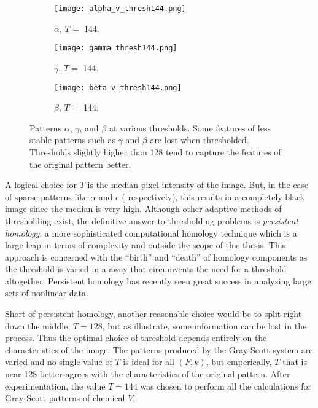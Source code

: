 \begin{figure}[p]
        \begin{subfigure}[b]{0.25\textwidth}
                \texttt{[image: alpha\_v\_thresh144.png]}
                \caption{$\alpha$, $T =$ 144.}
                \label{fig:alpha_144}
        \end{subfigure} \quad
         \begin{subfigure}[b]{0.25\textwidth}
                \texttt{[image: gamma\_thresh144.png]}
                \caption{$\gamma$, $T =$ 144.}
                \label{fig:gamma_144}
        \end{subfigure} \quad
         \begin{subfigure}[b]{0.25\textwidth}
                \texttt{[image: beta\_v\_thresh144.png]}
                \caption{$\beta$, $T =$ 144.}
                \label{fig:beta_144}
        \end{subfigure} \hfill
        \caption{Patterns $\alpha$, $\gamma$, and $\beta$ at various thresholds. Some features of less stable patterns such as $\gamma$ and $\beta$ are lost when thresholded. Thresholds slightly higher than 128 tend to capture the features of the original pattern better.} \label{fig:thresholds}
\end{figure}

A logical choice for $T$ is the median pixel intensity of the image. But, in the case of sparse patterns like $\alpha$ and $\epsilon$ ( respectively), this results in a completely black image since the median is very high. Although other adaptive methods of thresholding exist, the definitive answer to thresholding problems is \emph{persistent homology}, a more sophisticated computational homology technique which is a large leap in terms of complexity and outside the scope of this thesis. This approach is concerned with the ``birth'' and ``death'' of homology components as the threshold is varied in a away that circumvents the need for a threshold altogether. Persistent homology has recently seen great success in analyzing large sets of nonlinear data.

Short of persistent homology, another reasonable choice would be to split right down the middle, $T = 128$, but as  illustrate, some information can be lost in the process. Thus the optimal choice of threshold depends entirely on the characteristics of the image. The patterns produced by the Gray-Scott system are varied and no single value of $T$ is ideal for all $(F, k)$, but emperically, $T$ that is near 128 better agrees with the characteristics of the original pattern. After experimentation, the value $T = 144$ was chosen to perform all the calculations for Gray-Scott patterns of chemical $V$.

